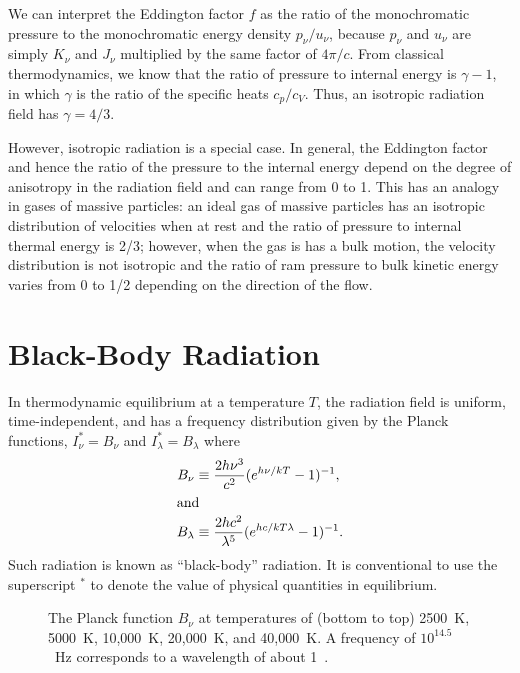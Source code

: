 We can interpret the Eddington factor $f$ as the ratio
of the monochromatic pressure to the monochromatic energy
density $p_\nu/u_\nu$, because $p_\nu$ and $u_\nu$ are
simply $K_\nu$ and $J_\nu$ multiplied by the same factor of
$4\pi/c$. From classical thermodynamics, we know that the
ratio of pressure to internal energy is $\gamma - 1$, in
which $\gamma$ is the ratio of the specific heats $c_p/c_V$.
Thus, an isotropic radiation field has $\gamma = 4/3$.

However, isotropic radiation is a special case. In general,
the Eddington factor and hence the ratio of the pressure to
the internal energy depend on the degree of anisotropy in
the radiation field and can range from 0 to 1. This has an
analogy in gases of massive particles: an ideal gas of
massive particles has an isotropic distribution of
velocities when at rest and the ratio of pressure to
internal thermal energy is 2/3; however, when the gas is has
a bulk motion, the velocity distribution is not isotropic
and the ratio of ram pressure to bulk kinetic energy varies
from 0 to 1/2 depending on the direction of the flow.

\newslide

\section{Black-Body Radiation}


In thermodynamic equilibrium at a temperature $T$, the
radiation field is uniform, time-independent, and has a
frequency distribution given by the Planck functions,
$I_\nu^* = B_\nu$ and $I_\lambda^* = B_\lambda$ where
\begin{align}
B_\nu &\equiv \frac{2 h \nu^3}{c^2}
(e^{h\nu/kT} -1)^{-1},
\\
\intertext{and}
B_\lambda &\equiv \frac{2 h c^2}{\lambda ^5}
(e^{hc/kT\lambda} -1)^{-1}.
\end{align}
Such radiation is known as ``black-body'' radiation. It is conventional
to use the superscript $^*$ to denote the value of physical quantities
in equilibrium.

\newslide

\begin{figure}
\footnotesize
{}
\caption{The Planck function $B_\nu$ at temperatures of (bottom to top)
  2500~K, 5000~K, 10,000~K, 20,000~K, and 40,000~K. A frequency of
  $10^{14.5}$~Hz corresponds to a wavelength of about 1~{\micron}.}
\label{figure-B-nu}
\end{figure}

